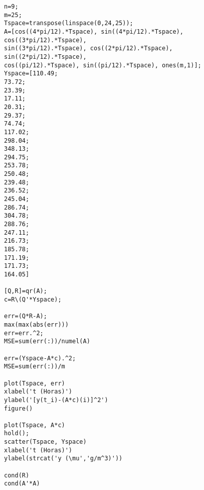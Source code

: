 \documentclass[a4paper, 12pt]{article}
\begin{document}
\begin{verbatim}
n=9;
m=25;
Tspace=transpose(linspace(0,24,25));
A=[cos((4*pi/12).*Tspace), sin((4*pi/12).*Tspace), cos((3*pi/12).*Tspace), 
sin((3*pi/12).*Tspace), cos((2*pi/12).*Tspace), sin((2*pi/12).*Tspace), 
cos((pi/12).*Tspace), sin((pi/12).*Tspace), ones(m,1)];
Yspace=[110.49; 
73.72; 
23.39; 
17.11; 
20.31; 
29.37; 
74.74; 
117.02; 
298.04; 
348.13; 
294.75; 
253.78; 
250.48; 
239.48; 
236.52; 
245.04; 
286.74; 
304.78; 
288.76; 
247.11; 
216.73; 
185.78; 
171.19; 
171.73; 
164.05]

[Q,R]=qr(A);
c=R\(Q'*Yspace);

err=(Q*R-A);
max(max(abs(err)))
err=err.^2;
MSE=sum(err(:))/numel(A)

err=(Yspace-A*c).^2;
MSE=sum(err(:))/m

plot(Tspace, err)
xlabel('t (Horas)')
ylabel('[y(t_i)-(A*c)(i)]^2')
figure()

plot(Tspace, A*c)
hold();
scatter(Tspace, Yspace)
xlabel('t (Horas)')
ylabel(strcat('y (\mu','g/m^3)'))

cond(R)
cond(A'*A)
\end{verbatim}
\end{document}
